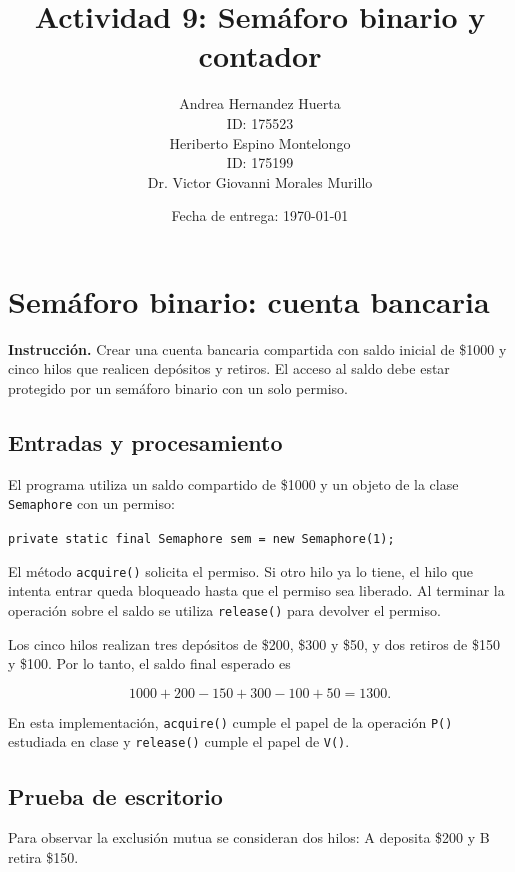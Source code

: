 \documentclass[12pt,oneside]{template/liverpoolthesis}
\title{Actividad 9: Semáforo binario y contador}
\author{%
  Andrea Hernandez Huerta\\
  ID: 175523\\[1em]
  Heriberto Espino Montelongo\\
  ID: 175199\\[1em]
  \text{Profesor:} Dr. Victor Giovanni Morales Murillo}
\date{Fecha de entrega: \today}
\begin{document}
\frontmatter
\maketitle
\tableofcontents
\listoffigures
\listoftables

\mainmatter

\chapter{Semáforo binario: cuenta bancaria}

\textbf{Instrucción.} Crear una cuenta bancaria compartida con saldo inicial de
\$1000 y cinco hilos que realicen depósitos y retiros. El acceso al saldo debe
estar protegido por un semáforo binario con un solo permiso.

\section{Entradas y procesamiento}

El programa utiliza un saldo compartido de \$1000 y un objeto de la clase
\texttt{Semaphore} con un permiso:

\begin{center}
\texttt{private static final Semaphore sem = new Semaphore(1);}
\end{center}

El método \texttt{acquire()} solicita el permiso. Si otro hilo ya lo tiene,
el hilo que intenta entrar queda bloqueado hasta que el permiso sea liberado.
Al terminar la operación sobre el saldo se utiliza \texttt{release()} para
devolver el permiso.

Los cinco hilos realizan tres depósitos de \$200, \$300 y \$50, y dos retiros
de \$150 y \$100. Por lo tanto, el saldo final esperado es

\[
1000+200-150+300-100+50=1300.
\]

En esta implementación, \texttt{acquire()} cumple el papel de la operación
\texttt{P()} estudiada en clase y \texttt{release()} cumple el papel de
\texttt{V()}.

\section{Prueba de escritorio}

Para observar la exclusión mutua se consideran dos hilos: A deposita \$200 y B
retira \$150.
\end{document}
